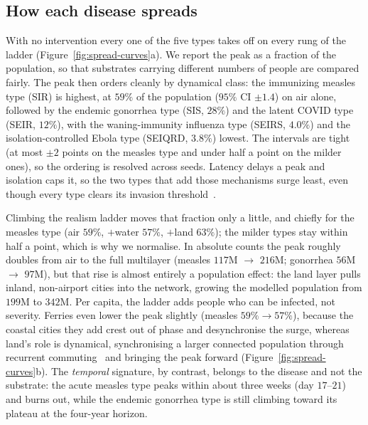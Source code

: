 \subsection{How each disease spreads}\label{sec:res-spread}
With no intervention every one of the five types takes off on every rung of the ladder
(Figure~\ref{fig:spread-curves}a). We report the peak as a fraction of the population, so that substrates
carrying different numbers of people are compared fairly. The peak then orders cleanly by dynamical
class: the immunizing measles type (SIR) is highest, at $59\%$ of the population ($95\%$ CI
$\pm1.4$) on air alone, followed by the endemic gonorrhea type (SIS, $28\%$) and the latent COVID
type (SEIR, $12\%$), with the waning-immunity influenza type (SEIRS, $4.0\%$) and the
isolation-controlled Ebola type (SEIQRD, $3.8\%$) lowest. The intervals are tight (at most $\pm2$
points on the measles type and under half a point on the milder ones), so the ordering is resolved
across seeds. Latency delays a peak and isolation caps it, so the two types that add those
mechanisms surge least, even though every type clears its invasion
threshold~\cite{colizza:invasion}.

Climbing the realism ladder moves that fraction only a little, and chiefly for the measles type (air
$59\%$, $+$water $57\%$, $+$land $63\%$); the milder types stay within half a point, which is why we
normalise. In absolute counts the peak roughly doubles from air to the full multilayer (measles
$117$M $\rightarrow$ $216$M; gonorrhea $56$M $\rightarrow$ $97$M), but that rise is almost entirely a
population effect: the land layer pulls inland, non-airport cities into the network, growing the
modelled population from $199$M to $342$M. Per capita, the ladder adds people who can be infected,
not severity. Ferries even lower the peak slightly (measles $59\% \rightarrow 57\%$),
because the coastal cities they add crest out of phase and desynchronise the surge, whereas land's
role is dynamical, synchronising a larger connected population through recurrent
commuting~\cite{balcan:recurrent} and bringing the peak forward (Figure~\ref{fig:spread-curves}b). The \emph{temporal} signature, by contrast, belongs to the
disease and not the substrate: the acute measles type peaks within about three weeks (day
$17$--$21$) and burns out, while the endemic gonorrhea type is still climbing toward its plateau at
the four-year horizon.

